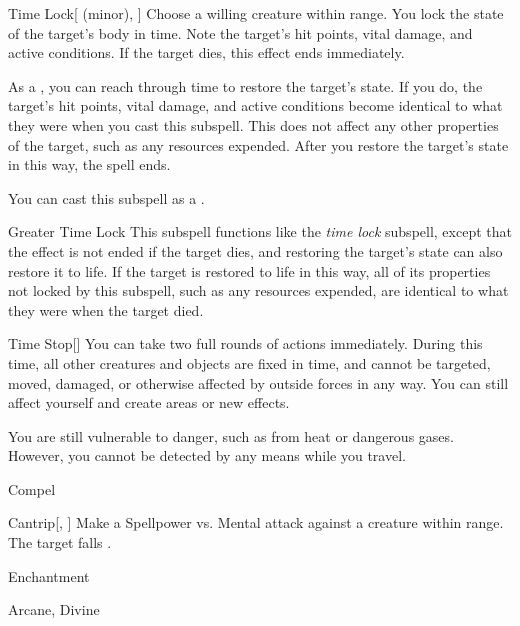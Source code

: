 \begin{ability}[\nth{6}]{Time Lock}[ (minor), ]
Choose a willing creature within \rngmed range.
You lock the state of the target's body in time.
Note the target's hit points, vital damage, and active conditions.
If the target dies, this effect ends immediately.

As a , you can reach through time to restore the target's state.
If you do, the target's hit points, vital damage, and active conditions become identical to what they were when you cast this subspell.
This does not affect any other properties of the target, such as any resources expended.
After you restore the target's state in this way, the spell ends.

You can cast this subspell as a .
\end{ability}
\vspace{0.25em}


\begin{ability}[\nth{9}]{Greater Time Lock}
This subspell functions like the \textit{time lock} subspell, except that the effect is not ended if the target dies, and restoring the target's state can also restore it to life.
If the target is restored to life in this way, all of its properties not locked by this subspell, such as any resources expended, are identical to what they were when the target died.
\end{ability}
\vspace{0.25em}


\begin{ability}[\nth{9}]{Time Stop}[]
You can take two full rounds of actions immediately.
During this time, all other creatures and objects are fixed in time, and cannot be targeted, moved, damaged, or otherwise affected by outside forces in any way.
You can still affect yourself and create areas or new effects.

You are still vulnerable to danger, such as from heat or dangerous gases.
However, you cannot be detected by any means while you travel.
\end{ability}
\vspace{0.25em}

\newpage
\begin{spellsection}{Compel}

\begin{spellheader}
\end{spellheader}


\begin{ability}{Cantrip}[, ]
Make a Spellpower vs. Mental attack against a creature within \rngmed range.
\hit The target falls .
\end{ability}




 Enchantment

 Arcane, Divine
\end{spellsection}



